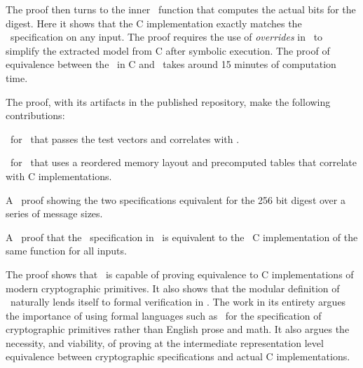 The proof then turns to the inner \keccak\ function that computes the actual bits for the digest.
Here it shows that the C implementation exactly matches the \cryptol\ specification on any input.
The proof requires the use of \emph{overrides} in \saw\ to simplify the extracted model from C after symbolic execution.
The proof of equivalence between the \keccak\ in C and \cryptol\ takes around 15 minutes of computation time.

The proof, with its artifacts in the published repository, make the following contributions:
\begin{compactitem}
  \item \cryptol\ for \shaThree\ that passes the test vectors and correlates with \fips.
  \item \cryptol\ for \shaThree\ that uses a reordered memory layout and precomputed tables that correlate with C implementations.
  \item A \saw\ proof showing the two specifications equivalent for the 256 bit digest over a series of message sizes.
  \item A \saw\ proof that the \keccak\ specification in \cryptol\ is equivalent to the \openssl\ C implementation of the same function for all inputs.
\end{compactitem}
The proof shows that \saw\ is capable of proving equivalence to C implementations of modern cryptographic primitives.
It also shows that the modular definition of \shaThree\ naturally lends itself to formal verification in \saw.
The work in its entirety argues the importance of using formal languages such as \cryptol\ for the specification of cryptographic primitives rather than English prose and math.
It also argues the necessity, and viability, of proving at the intermediate representation level equivalence between cryptographic specifications and actual C implementations.

